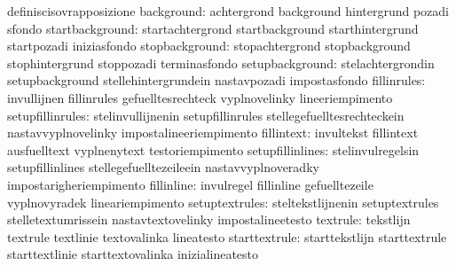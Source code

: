                                   definiscisovrapposizione
                      background: achtergrond                      background
                                  hintergrund                      pozadi
                                  sfondo
                 startbackground: startachtergrond                 startbackground
                                  starthintergrund                 startpozadi
                                  iniziasfondo
                  stopbackground: stopachtergrond                  stopbackground
                                  stophintergrund                  stoppozadi
                                  terminasfondo
                 setupbackground: stelachtergrondin                setupbackground
                                  stellehintergrundein             nastavpozadi
                                  impostasfondo
                     fillinrules: invullijnen                      fillinrules
                                  gefuelltesrechteck               vyplnovelinky %
                                  lineeriempimento
                setupfillinrules: stelinvullijnenin                setupfillinrules
                                  stellegefuelltesrechteckein      nastavvyplnovelinky
                                  impostalineeriempimento
                      fillintext: invultekst                       fillintext
                                  ausfuelltext                     vyplnenytext
                                  testoriempimento
                setupfillinlines: stelinvulregelsin                setupfillinlines
                                  stellegefuelltezeileein          nastavvyplnoveradky
                                  impostarigheriempimento
                      fillinline: invulregel                       fillinline
                                  gefuelltezeile                   vyplnovyradek
                                  lineariempimento
                  setuptextrules: steltekstlijnenin                setuptextrules
                                  stelletextumrissein              nastavtextovelinky
                                  impostalineetesto
                        textrule: tekstlijn                        textrule
                                  textlinie                        textovalinka
                                  lineatesto
                   starttextrule: starttekstlijn                   starttextrule
                                  starttextlinie                   starttextovalinka
                                  inizialineatesto

